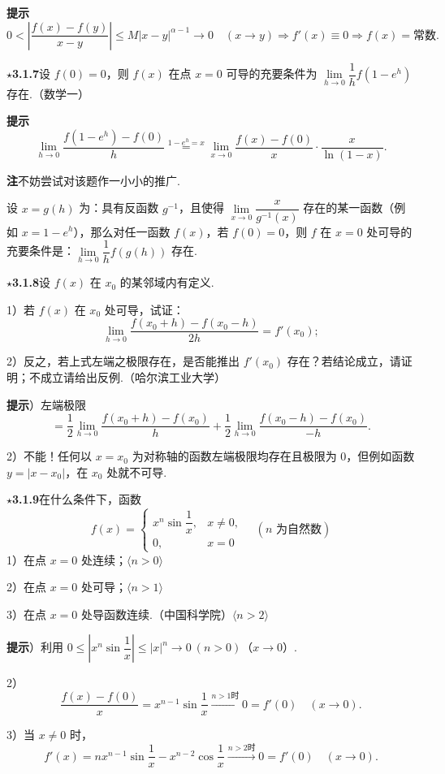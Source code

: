 \documentclass[UTF8, 12pt, fontset=fandol, oneside]{ctexart}
\begin{document}
\noindent\textbf{提示}\quad
\[
  0<\left|\frac{f(x)-f(y)}{x-y}\right|
  \le M|x-y|^{\alpha-1}\to0\quad(x\to y)\Rightarrow f'(x)\equiv0\Rightarrow f(x)=\text{常数}.
\]

\noindent\textbf{$\star$3.1.7}\quad 设 $f(0)=0$，则 $f(x)$ 在点 $x=0$ 可导的充要条件为 $\lim\limits_{h\to0}\dfrac1h f(1-e^h)$ 存在.（数学一）

\noindent\textbf{提示}\quad
\[
  \lim_{h\to0}\frac{f(1-e^h)-f(0)}h
  \stackrel{1-e^h=x}{=}\lim_{x\to0}\frac{f(x)-f(0)}x\cdot\frac{x}{\ln(1-x)}.
\]

\noindent\textbf{注}\quad 不妨尝试对该题作一小小的推广.

设 $x=g(h)$ 为：具有反函数 $g^{-1}$，且使得 $\lim\limits_{x\to0}\dfrac{x}{g^{-1}(x)}$ 存在的某一函数（例如 $x=1-e^h$），那么对任一函数 $f(x)$，若 $f(0)=0$，则 $f$ 在 $x=0$ 处可导的充要条件是：$\lim\limits_{h\to0}\dfrac1h f(g(h))$ 存在.

\noindent\textbf{$\star$3.1.8}\quad 设 $f(x)$ 在 $x_0$ 的某邻域内有定义.

1）若 $f(x)$ 在 $x_0$ 处可导，试证：
\[
  \lim_{h\to0}\frac{f(x_0+h)-f(x_0-h)}{2h}=f'(x_0);
\]

2）反之，若上式左端之极限存在，是否能推出 $f'(x_0)$ 存在？若结论成立，请证明；不成立请给出反例.（哈尔滨工业大学）

\noindent\textbf{提示}）左端极限
\[
=\frac12\lim_{h\to0}\frac{f(x_0+h)-f(x_0)}h
+\frac12\lim_{h\to0}\frac{f(x_0-h)-f(x_0)}{-h}.
\]

2）不能！任何以 $x=x_0$ 为对称轴的函数左端极限均存在且极限为 0，但例如函数 $y=|x-x_0|$，在 $x_0$ 处就不可导.

\noindent\textbf{$\star$3.1.9}\quad 在什么条件下，函数
\[
f(x)=
\begin{cases}
x^n\sin\dfrac1x, & x\ne0,\\
0, & x=0
\end{cases}
\quad(n\text{ 为自然数})
\]
1）在点 $x=0$ 处连续；\quad $\langle n>0\rangle$

2）在点 $x=0$ 处可导；\quad $\langle n>1\rangle$

3）在点 $x=0$ 处导函数连续.（中国科学院）\quad $\langle n>2\rangle$

\noindent\textbf{提示}）利用 $0\le\left|x^n\sin\dfrac1x\right|\le|x|^n\to0\ (n>0)$（$x\to0$）.

2）
\[
  \frac{f(x)-f(0)}x=x^{n-1}\sin\frac1x\stackrel{n>1\text{时}}{\longrightarrow}0=f'(0)\quad(x\to0).
\]

3）当 $x\ne0$ 时，
\[
  f'(x)=nx^{n-1}\sin\frac1x-x^{n-2}\cos\frac1x
  \stackrel{n>2\text{时}}{\longrightarrow}0=f'(0)\quad(x\to0).
\]
\end{document}

